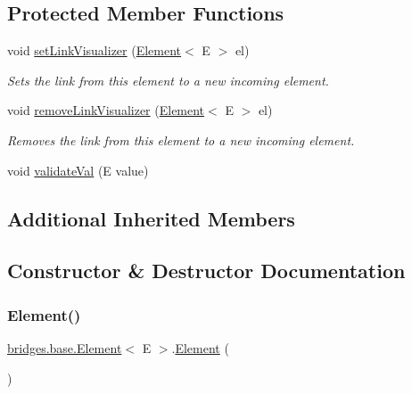 \subsection*{Protected Member Functions}
\begin{DoxyCompactItemize}
\item 
void \mbox{\hyperlink{classbridges_1_1base_1_1_element_af6251f52b9d277dd77e3bab1829d0197}{set\+Link\+Visualizer}} (\mbox{\hyperlink{classbridges_1_1base_1_1_element}{Element}}$<$ E $>$ el)
\begin{DoxyCompactList}\small\item\em Sets the link from this element to a new incoming element. \end{DoxyCompactList}\item 
void \mbox{\hyperlink{classbridges_1_1base_1_1_element_a144cd54e043a801fab326769a5da01e2}{remove\+Link\+Visualizer}} (\mbox{\hyperlink{classbridges_1_1base_1_1_element}{Element}}$<$ E $>$ el)
\begin{DoxyCompactList}\small\item\em Removes the link from this element to a new incoming element. \end{DoxyCompactList}\item 
void \mbox{\hyperlink{classbridges_1_1base_1_1_element_af1a60f4e6a91d379179f7d56e6dc3829}{validate\+Val}} (E value)
\end{DoxyCompactItemize}
\subsection*{Additional Inherited Members}


\subsection{Constructor \& Destructor Documentation}
\mbox{\label{classbridges_1_1base_1_1_element_aa5fc5728f2ed4b041118a77409442390}} 
\subsubsection{\texorpdfstring{Element()}{Element()}\hspace{0.1cm}{\footnotesize\ttfamily [1/4]}}
{\footnotesize\ttfamily \mbox{\hyperlink{classbridges_1_1base_1_1_element}{bridges.\+base.\+Element}}$<$ E $>$.\mbox{\hyperlink{classbridges_1_1base_1_1_element}{Element}} (\begin{DoxyParamCaption}{ }\end{DoxyParamCaption})}



